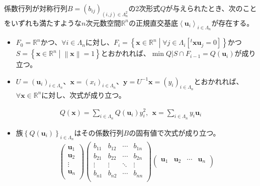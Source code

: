 \documentclass[dvipdfmx]{jsarticle}
\begin{document}
\begin{thm}\label{4.4.3.7}
係数行列が対称行列$B = \left( b_{ij} \right)_{(i,j) \in \varLambda_{n}^{2}}$の2次形式$Q$が与えられたとき、次のことをいずれも満たすような$n$次元数空間$\mathbb{R}^{n}$の正規直交基底$\left\langle \mathbf{u}_{i} \right\rangle_{i \in \varLambda_{n}}$が存在する。
\begin{itemize}
\item
  $F_{0} = \mathbb{R}^{n}$かつ、$\forall i \in \varLambda_{n}$に対し、$F_{i} = \left\{ \mathbf{x} \in \mathbb{R}^{n} \middle| \forall j \in \varLambda_{i}\left[{}^t \mathbf{x}\mathbf{u}_{j} = 0 \right] \right\}$かつ$S = \left\{ \mathbf{x} \in \mathbb{R}^{n} \middle| \left\| \mathbf{x} \right\| = 1 \right\}$とおかれれば、$\min{Q|S \cap F_{i - 1}} = Q\left( \mathbf{u}_{i} \right)$が成り立つ。
\item
  $U = \left( \mathbf{u}_{i} \right)_{i \in \varLambda_{n}}$、$\mathbf{x} = \left( x_{i} \right)_{i \in \varLambda_{n}}$、$\mathbf{y} = U^{- 1}\mathbf{x} = \left( y_{i} \right)_{i \in \varLambda_{n}}$とおかれれば、$\forall\mathbf{x} \in \mathbb{R}^{n}$に対し、次式が成り立つ。
\end{itemize}
\begin{align*}
Q\left( \mathbf{x} \right) = \sum_{i \in \varLambda_{n}} {Q\left( \mathbf{u}_{i} \right)y_{i}^{2}},\mathbf{\ \ x} = \sum_{i \in \varLambda_{n}} {y_{i}\mathbf{u}_{i}}
\end{align*}
\begin{itemize}
\item
  族$\left\{ Q\left( \mathbf{u}_{i} \right) \right\}_{i \in \varLambda_{n}}$はその係数行列$B$の固有値で次式が成り立つ。
\begin{align*}
\begin{pmatrix}
\mathbf{u}_{1} \\
\mathbf{u}_{2} \\
 \vdots \\
\mathbf{u}_{n} \\
\end{pmatrix}\begin{pmatrix}
b_{11} & b_{12} & \cdots & b_{1n} \\
b_{21} & b_{22} & \cdots & b_{2n} \\
 \vdots & \vdots & \ddots & \vdots \\
b_{n1} & b_{n2} & \cdots & b_{nn} \\
\end{pmatrix}\begin{pmatrix}
\mathbf{u}_{1} & \mathbf{u}_{2} & \cdots & \mathbf{u}_{n} \\

\end{pmatrix}
\end{align*}
\end{itemize}
\end{thm}
\end{document}
